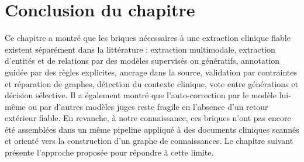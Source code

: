 \section{Conclusion du chapitre}

Ce chapitre a montré que les briques nécessaires à une extraction clinique fiable existent séparément dans la littérature : extraction multimodale, extraction d'entités et de relations par des modèles supervisés ou génératifs, annotation guidée par des règles explicites, ancrage dans la source, validation par contraintes et réparation de graphes, détection du contexte clinique, vote entre générations et décision sélective. Il a également montré que l'auto-correction par le modèle lui-même ou par d'autres modèles juges reste fragile en l'absence d'un retour extérieur fiable. En revanche, à notre connaissance, ces briques n'ont pas encore été assemblées dans un même pipeline appliqué à des documents cliniques scannés et orienté vers la construction d'un graphe de connaissances. Le chapitre suivant présente l'approche proposée pour répondre à cette limite.
